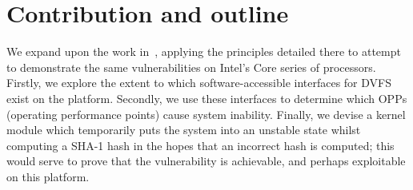 \section{Contribution and outline}

We expand upon the work in~\cite{clkscrew}, applying the principles detailed
there to attempt to demonstrate the same vulnerabilities on Intel's Core
series of processors. Firstly, we explore the extent to which
software-accessible interfaces for DVFS exist on the platform. Secondly, we use
these interfaces to determine which OPPs (operating performance points) cause
system inability. Finally, we devise a kernel module which temporarily puts the
system into an unstable state whilst computing a SHA-1 hash in the hopes that
an incorrect hash is computed; this would serve to prove that the \clkscrew{}
vulnerability is achievable, and perhaps exploitable on this platform.
